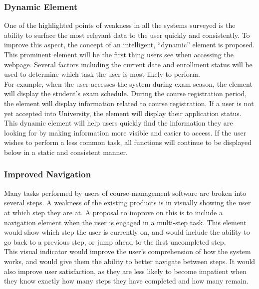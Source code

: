 \documentclass[10pt]{article}
\begin{document}
\begin{multicols}{2}
\subsubsection*{Dynamic Element}
One of the highlighted points of weakness in all the systems surveyed is the ability to surface the most relevant data to the user quickly and consistently. To improve this aspect, the concept of an intelligent, ``dynamic'' element is proposed. This prominent element will be the first thing users see when accessing the webpage. Several factors including the current date and enrollment status will be used to determine which task the user is most likely to perform.\\

For example, when the user accesses the system during exam season, the element will display the student's exam schedule. During the course registration period, the element will display information related to course registration. If a user is not yet accepted into University, the element will display their application status.\\

This dynamic element will help users quickly find the information they are looking for by making information more visible and easier to access. If the user wishes to perform a less common task, all functions will continue to be displayed below in a static and consistent manner.\\

\subsubsection*{Improved Navigation}
Many tasks performed by users of course-management software are broken into several steps. A weakness of the existing products is in visually showing the user at which step they are at. A proposal to improve on this is to include a navigation element when the user is engaged in a multi-step task. This element would show which step the user is currently on, and would include the ability to go back to a previous step, or jump ahead to the first uncompleted step.\\

This visual indicator would improve the user's comprehension of how the system works, and would give them the ability to better navigate between steps. It would also improve user satisfaction, as they are less likely to become impatient when they know exactly how many steps they have completed and how many remain. 


\end{multicols}
\end{document}
